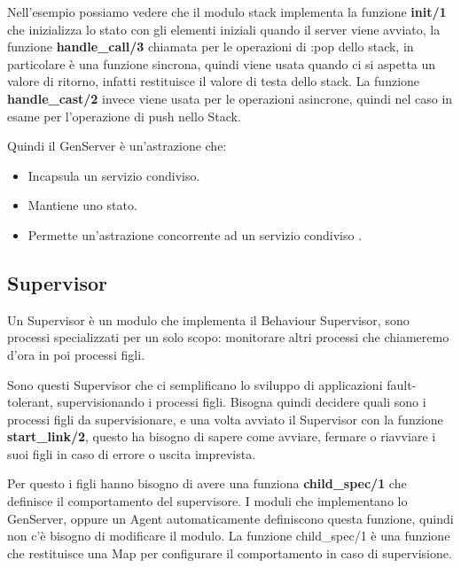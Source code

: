 Nell'esempio possiamo vedere che il modulo stack implementa
la funzione \textbf{init/1} che inizializza lo stato con gli elementi
iniziali quando il server viene avviato, la funzione \textbf{handle\_call/3}
chiamata per le operazioni di :pop dello stack, in particolare
è una funzione sincrona, quindi viene usata quando ci si aspetta
un valore di ritorno, infatti restituisce il valore di
testa dello stack. La funzione \textbf{handle\_cast/2} invece viene usata per
le operazioni asincrone, quindi nel caso in esame per l'operazione di
push nello Stack.

Quindi il GenServer è un'astrazione che:

\begin{itemize}
	\item Incapsula un servizio condiviso.
	\item Mantiene uno stato.
	\item Permette un'astrazione concorrente ad un servizio condiviso \cite{adoptingElixirchap5pag96}.
\end{itemize}


\subsection{Supervisor}

Un Supervisor è un modulo che implementa il Behaviour Supervisor,
sono processi specializzati per un solo scopo: monitorare altri processi
che chiameremo d'ora in poi processi figli.

Sono questi Supervisor che ci semplificano lo sviluppo di applicazioni
fault-tolerant, supervisionando i processi figli.
Bisogna quindi decidere quali sono i processi figli da supervisionare,
e una volta avviato il Supervisor con la funzione \textbf{start\_link/2},
questo ha bisogno di sapere come avviare, fermare o riavviare i suoi figli
in caso di errore o uscita imprevista.

Per questo i figli hanno bisogno di avere una funziona \textbf{child\_spec/1}
che definisce il comportamento del supervisore. I moduli che implementano
lo GenServer, oppure un Agent automaticamente definiscono questa funzione,
quindi non c'è bisogno di modificare il modulo.
La funzione child\_spec/1 è una funzione che restituisce una Map per
configurare il comportamento in caso di supervisione.


